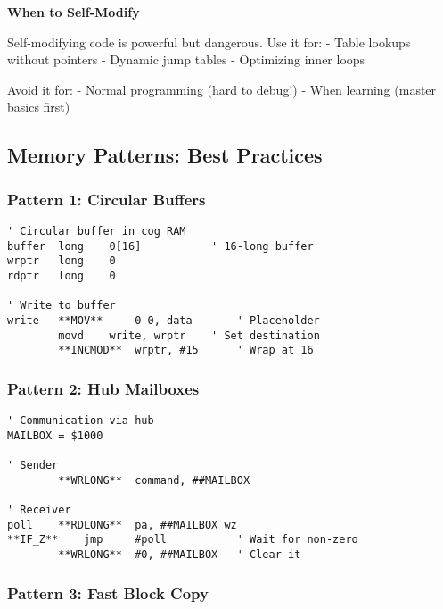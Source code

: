\documentclass[11pt]{book}
\begin{document}
\begin{sidetrack}
\textbf{When to Self-Modify}

Self-modifying code is powerful but dangerous. Use it for:
- Table lookups without pointers
- Dynamic jump tables
- Optimizing inner loops

Avoid it for:
- Normal programming (hard to debug!)
- When learning (master basics first)
\end{sidetrack}

\hypertarget{memory-patterns-best-practices}{%
\subsection{Memory Patterns: Best
Practices}\label{memory-patterns-best-practices}}

\hypertarget{pattern-1-circular-buffers}{%
\subsubsection{Pattern 1: Circular
Buffers}\label{pattern-1-circular-buffers}}

\begin{lstlisting}
' Circular buffer in cog RAM
buffer  long    0[16]           ' 16-long buffer
wrptr   long    0
rdptr   long    0

' Write to buffer
write   **MOV**     0-0, data       ' Placeholder
        movd    write, wrptr    ' Set destination
        **INCMOD**  wrptr, #15      ' Wrap at 16
\end{lstlisting}

\hypertarget{pattern-2-hub-mailboxes}{%
\subsubsection{Pattern 2: Hub Mailboxes}\label{pattern-2-hub-mailboxes}}

\begin{lstlisting}
' Communication via hub
MAILBOX = $1000

' Sender
        **WRLONG**  command, ##MAILBOX
        
' Receiver  
poll    **RDLONG**  pa, ##MAILBOX wz
**IF_Z**    jmp     #poll           ' Wait for non-zero
        **WRLONG**  #0, ##MAILBOX   ' Clear it
\end{lstlisting}

\hypertarget{pattern-3-fast-block-copy}{%
\subsubsection{Pattern 3: Fast Block
Copy}\label{pattern-3-fast-block-copy}}
\end{document}
